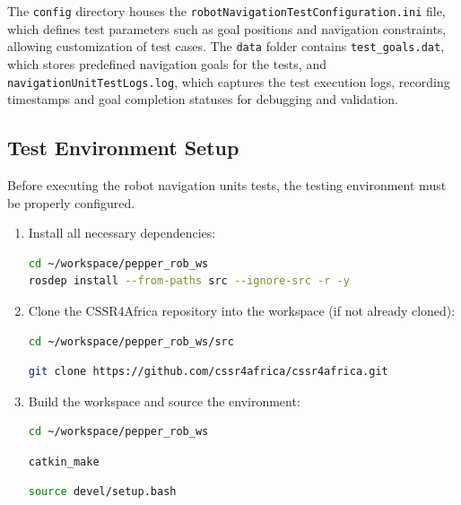 \documentclass{CSSRforAfrica}
\begin{document}
\noindent The \texttt{config} directory houses the \texttt{robotNavigationTestConfiguration.ini} file, which defines test parameters such as goal positions and navigation constraints, allowing customization of test cases. The \texttt{data} folder contains \texttt{test\_goals.dat}, which stores predefined navigation goals for the tests, and \texttt{navigationUnitTestLogs.log}, which captures the test execution logs, recording timestamps and goal completion statuses for debugging and validation.



\subsection{Test Environment Setup}
Before executing the robot navigation units tests, the testing environment must be properly configured.

\begin{enumerate}
\item Install all necessary dependencies:
\begin{lstlisting}[style=withoutNumbering, language=bash]
cd ~/workspace/pepper_rob_ws
rosdep install --from-paths src --ignore-src -r -y
\end{lstlisting}

\item Clone the CSSR4Africa repository into the workspace (if not already cloned):
\begin{lstlisting}[style=withoutNumbering, language=bash]
cd ~/workspace/pepper_rob_ws/src
\end{lstlisting}
\begin{lstlisting}[style=withoutNumbering, language=bash]
git clone https://github.com/cssr4africa/cssr4africa.git
\end{lstlisting}
\item Build the workspace and source the environment:
\begin{lstlisting}[style=withoutNumbering, language=bash]
cd ~/workspace/pepper_rob_ws
\end{lstlisting}

\begin{lstlisting}[style=withoutNumbering, language=bash]
catkin_make
\end{lstlisting}

\begin{lstlisting}[style=withoutNumbering, language=bash]
source devel/setup.bash
\end{lstlisting}
\end{enumerate}
\end{document}
